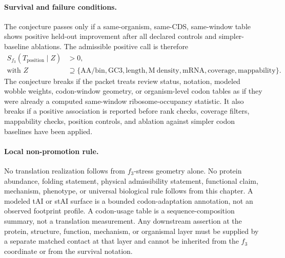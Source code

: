 \paragraph{Survival and failure conditions.}
The conjecture passes only if a same-organism, same-CDS, same-window table shows positive held-out improvement after all declared controls and simpler-baseline ablations. The admissible positive call is therefore
$$
\begin{aligned}
S_{f_3}(T_{\mathrm{position}} \mid Z) &> 0,\\
\text{with } Z &\supseteq \{\mathrm{AA/bin},\mathrm{GC3},\mathrm{length},\mathrm{M\ density},\mathrm{mRNA},\mathrm{coverage},\mathrm{mappability}\}.
\end{aligned}
$$
The conjecture breaks if the packet treats review status, notation, modeled wobble weights, codon-window geometry, or organism-level codon tables as if they were already a computed same-window ribosome-occupancy statistic. It also breaks if a positive association is reported before rank checks, coverage filters, mappability checks, position controls, and ablation against simpler codon baselines have been applied.

\paragraph{Local non-promotion rule.}
No translation realization follows from $f_3$-stress geometry alone. No protein abundance, folding statement, physical admissibility statement, functional claim, mechanism, phenotype, or universal biological rule follows from this chapter. A modeled tAI or stAI surface is a bounded codon-adaptation annotation, not an observed footprint profile. A codon-usage table is a sequence-composition summary, not a translation measurement. Any downstream assertion at the protein, structure, function, mechanism, or organismal layer must be supplied by a separate matched contact at that layer and cannot be inherited from the $f_3$ coordinate or from the survival notation.
